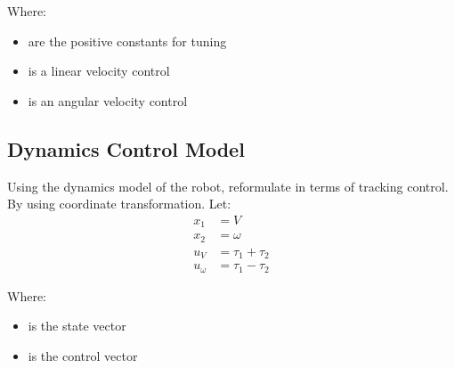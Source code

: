 Where:
\begin{itemize}
	\item { are the positive constants for tuning}
	\item { is a linear velocity control}
	\item { is an angular velocity control}
	
\end{itemize}






\subsection{Dynamics Control Model}
\hspace{1.27cm}
Using the dynamics model of the robot, reformulate in terms of tracking control. By using coordinate transformation. Let:
\begin{equation}
\begin{split}
x_1 &= V\\
x_2 &= \omega\\
u_V &= \tau_1 + \tau_2\\
u_\omega &= \tau_1 - \tau_2
\end{split}
\end{equation}

Where:
\begin{itemize}
	\item { is the state vector}
	\item { is the control vector}
	
\end{itemize}

